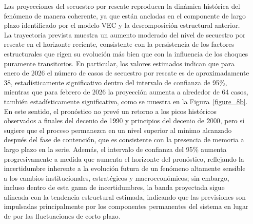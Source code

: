 \documentclass[12pt]{article}
\theoremstyle{definition}
\theoremstyle{remark}
\newcommand{\1}{\mathbf{1}}
\begin{document}
Las proyecciones del secuestro por rescate reproducen la dinámica histórica del fenómeno de manera coherente, ya que están ancladas en el componente de largo plazo identificado por el modelo VEC y la descomposición estructural anterior. La trayectoria prevista muestra un aumento moderado del nivel de secuestro por rescate en el horizonte reciente, consistente con la persistencia de los factores estructurales que rigen su evolución más bien que con la influencia de los choques puramente transitorios. En particular, los valores estimados indican que para enero de 2026 el número de casos de secuestro por rescate es de aproximadamente 38, estadísticamente significativo dentro del intervalo de confianza de 95\%, mientras que para febrero de 2026 la proyección aumenta a alrededor de 64 casos, también estadísticamente significativo, como se muestra en la Figura~\ref{figure_8b}. En este sentido, el pronóstico no prevé un retorno a los picos históricos observados a finales del decenio de 1990 y principios del decenio de 2000, pero sí sugiere que el proceso permanezca en un nivel superior al mínimo alcanzado después del fase de contención, que es consistente con la presencia de memoria a largo plazo en la serie. Además, el intervalo de confianza del 95\% aumenta progresivamente a medida que aumenta el horizonte del pronóstico, reflejando la incertidumbre inherente a la evolución futura de un fenómeno altamente sensible a los cambios institucionales, estratégicos y macroeconómicos; sin embargo, incluso dentro de esta gama de incertidumbres, la banda proyectada sigue alineada con la tendencia estructural estimada, indicando que las previsiones son impulsadas principalmente por los componentes permanentes del sistema en lugar de por las fluctuaciones de corto plazo.
\end{document}
